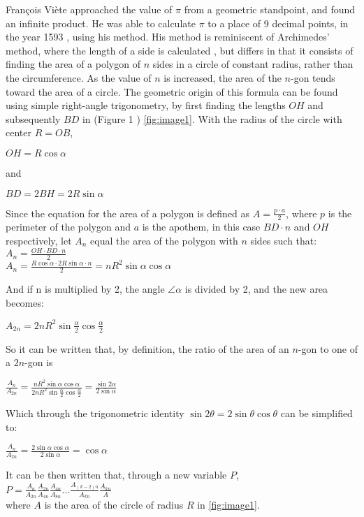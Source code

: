 François Viète approached the value of $\pi$ from a 
geometric standpoint, and found an infinite product. 
He was able to calculate $\pi$ to a place of 9 decimal points, in 
the year 1593 \cite{Kreminski}, using his method. His method is reminiscent 
of Archimedes' method, where the length of a side is calculated \cite{archimedespi}, 
but differs in that it consists of finding the area of a polygon of $n$ sides in a circle of constant 
radius, rather than the circumference. As the value of $n$ is increased, the area of the $n$-gon 
tends toward the area of a circle. The geometric origin of this formula 
can be found using simple right-angle trigonometry, by first finding 
the lengths $OH$ and subsequently $BD$ in (Figure 1 ) \ref{fig:image1}.
With the radius of the circle with center $R = OB$,

$OH = R \cos{\alpha}$ 

and

$BD = 2BH = 2 R \sin{\alpha}$

Since the equation for the area of a polygon is defined as $A = \frac{p \cdot a}{2}$, 
where $p$ is the perimeter of the polygon and $a$ is the apothem, in this case $BD \cdot n$ 
and $OH$ respectively, let $A_{n}$ equal the area of 
the polygon with $n$ sides such that: \\
$A_{n} = \frac{OH \cdot BD \cdot n}{2}$ \\
$A_{n} = \frac{R \cos{\alpha} \cdot 2 R \sin{\alpha} \cdot n}{2} = n R^2 \sin{\alpha} \cos{\alpha}$

And if n is multiplied by 2, the angle $\angle \alpha$ is divided by 2, 
and the new area becomes: 

$A_{2n} = 2n R^2 \sin{\frac{\alpha}{2}} \cos{\frac{\alpha}{2}}$

So it can be written that, by definition, the ratio of 
the area of an $n$-gon to one of a $2n$-gon is

$\frac{A_{n}}{A_{2n}} = \frac{n R^2 \sin{\alpha} \cos{\alpha}}{2 n R^2 \sin{\frac{\alpha}{2}} \cos{\frac{\alpha}{2}}} = \frac{\sin{2 \alpha}}{2 \sin{\alpha}}$

Which through the trigonometric identity $\sin{2 \theta} = 2\sin{\theta} \cos{\theta}$ can 
be simplified to:

$\frac{A_{n}}{A_{2n}} = \frac{2\sin{\alpha} \cos{\alpha} }{2\sin{\alpha}}  = \cos{\alpha}$

It can be then written that, through a new variable $P$, \\
$P = \frac{A_{n}}{A_{2n}} \frac{A_{2n}}{A_{4n}} \frac{A_{4n}}{A_{8n}} \dots \frac{A_{(k-2)n}}{A_{kn}} \frac{A_{kn}}{A}$ \\
where $A$ is the area of the circle of radius $R$ 
in \ref{fig:image1}. 

